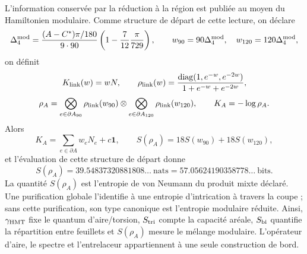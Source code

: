 L’information conservée par la réduction à la région est publiée au moyen du
Hamiltonien modulaire. Comme structure de départ de cette lecture, on déclare
\[
 \Delta_4^{\rm mod}
 =\frac{(A-C^*)\pi/180}{9\cdot90}
 \left(1-\frac7{12}\frac\pi{729}\right),
 \qquad w_{90}=90\Delta_4^{\rm mod},\quad
 w_{120}=120\Delta_4^{\rm mod},
\]
on définit
\[
 K_{\rm link}(w)=wN,
 \qquad
 \rho_{\rm link}(w)=
 \frac{\operatorname{diag}(1,e^{-w},e^{-2w})}
 {1+e^{-w}+e^{-2w}},
\]
\begin{equation}
 \rho_A=
 \bigotimes_{e\in\partial A_{90}}\rho_{\rm link}(w_{90})
 \otimes
 \bigotimes_{e\in\partial A_{120}}\rho_{\rm link}(w_{120}),
 \qquad K_A=-\log\rho_A.
 \label{p12-83-c14-s2:eq:estado-hamiltoniano-modular-barbero-rev11}
\end{equation}
Alors
\[
 K_A=\sum_{e\in\partial A}w_eN_e+c\mathbf1,
 \qquad
 S(\rho_A)=18S(w_{90})+18S(w_{120}),
\]
et l’évaluation de cette structure de départ donne
\[
 S(\rho_A)=39.54837320881808\ldots\ \text{nats}
 =57.05624190358778\ldots\ \text{bits}.
\]
La quantité \(S(\rho_A)\) est l’entropie de von Neumann du produit mixte
déclaré. Une purification globale l’identifie à une entropie
d’intrication à travers la coupe ; sans cette purification, son type canonique est
l’entropie modulaire réduite. Ainsi, \(\gamma_{\rm HMT}\) fixe le quantum
d’aire/torsion, \(S_{\rm tri}\) compte la capacité aréale, \(S_{\rm bi}\)
quantifie la répartition entre feuillets et \(S(\rho_A)\) mesure le mélange modulaire.
L’opérateur d’aire, le spectre et l’entrelaceur appartiennent à une seule construction
de bord.
